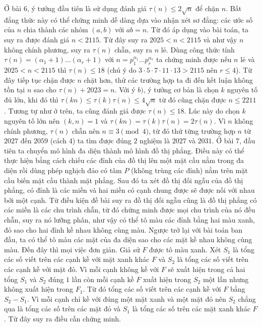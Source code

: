 \begin{multicols}{2}
	\vskip 0.1cm
	Ở bài $6$, ý tưởng đầu tiên là sử dụng đánh giá $\tau (n) \le 2\sqrt n $  để chặn $n$. Bất đẳng thức này có thể chứng minh dễ dàng dựa vào nhận xét sơ đẳng: các ước số của $n$ chia thành các nhóm $(a, b)$ với $ab = n$. Từ đó áp dụng vào bài toán, ta suy ra được đánh giá $n < 2115$. Từ đây suy ra $2025 < n < 2115$ và như vậy $n$ không chính phương, suy ra $\tau(n)$ chẵn, suy ra $n$ lẻ. Dùng công thức tính $\tau(n) = (\alpha_1+1)\ldots(\alpha_r+1)$ với $n = p_1^{{\alpha _1}}...p_r^{{\alpha _r}}$  ta chứng minh được nếu $n$ lẻ và $2025 < n < 2115$ thì  $\tau(n) \le 18$  (chú ý do $3\cdot5\cdot7\cdot11\cdot13 > 2115$ nên $r \le 4$). Từ đây tiếp tục chặn được $n$ chặt hơn, thử các trường hợp ta đi đến kết luận không tồn tại $n$ sao cho  $\tau (n) + 2023 = n$. Với ý $b)$, ý tưởng cơ bản là chọn $k$ nguyên tố đủ lớn, khi đó thì $\tau (kn) \le \tau (k)\tau (n) \le 4\sqrt n$  từ đó cũng chặn được $n \le 2211$. Tương tự như ở trên, ta cũng đánh giá được $\tau(n) \le 18$. Lúc này do chọn $k$ nguyên tố lớn nên $(k, n) = 1$ và $\tau (kn) = \tau (k)\tau (n) = 2\tau (n)$. Vì $n$ không chính phương, $\tau(n)$ chẵn nên $n \equiv 3 \pmod 4$, từ đó thử từng trường hợp $n$ từ $2027$ đến $2059$ (cách $4$) ta tìm được đúng $2$ nghiệm là $2027$ và $2031$.
	\vskip 0.1cm 
	Ở bài $7$, đầu tiên ta chuyển mô hình đa diện thành mô hình đồ thị phẳng. Điều này có thể thực hiện bằng cách chiếu các đỉnh của đồ thị lên một mặt cầu nằm trong đa diện rồi dùng phép nghịch đảo có tâm $P$ (không trùng các đỉnh) nằm trên mặt cầu biến mặt cầu thành mặt phẳng. Sau đó ta xét đồ thị đối ngẫu của đồ thị phẳng, có đỉnh là các miền và hai miền có cạnh chung được sẽ được nối với nhau bởi một cạnh. Từ điều kiện đề bài suy ra đồ thị đối ngẫu cũng là đồ thị phẳng có các miền là các chu trình chẵn, từ đó chứng minh được mọi chu trình của nó đều chẵn, suy ra nó lưỡng phân, như vậy có thể tô màu các đỉnh bằng hai màu xanh, đỏ sao cho hai đỉnh kề nhau không cùng màu. Ngược trở lại với bài toán ban đầu, ta có thể tô màu các mặt của đa diện sao cho các mặt kề nhau không cùng màu. Đến đây thì mọi việc đơn giản. Giả sử $F$ được tô màu xanh. Xét $S_1$ là tổng các số viết trên các cạnh kề với mặt xanh khác $F$ và $S_2$ là tổng các số viết trên các cạnh kề với mặt đỏ. Vì mỗi cạnh không kề với $F$ sẽ xuất hiện trong cả hai tổng $S_1$ và $S_2$ đúng $1$ lần còn mỗi cạnh kề $F$ xuất hiện trong $S_2$ một lần nhưng không xuất hiện trong $F_1$. Từ đó tổng các số viết trên các cạnh kề với $F$ bằng $S_2 - S_1$. Vì mỗi cạnh chỉ kề với đúng một mặt xanh và một mặt đỏ nên $S_2$ chẳng qua là tổng các số trên các mặt đỏ và $S_1$ là tổng các số trên các mặt xanh khác $F$. Từ đây suy ra điều cần chứng minh.  

\end{multicols}
